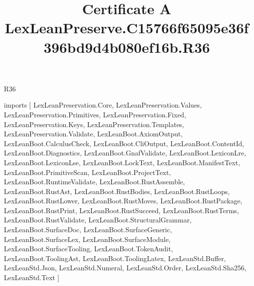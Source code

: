 \begin{lexlean}{R36}
\title{Certificate A LexLeanPreserve.C15766f65095e36f396bd9d4b080ef16b.R36}
\begin{coremodule}
imports [
  LexLeanPreservation.Core,
  LexLeanPreservation.Values,
  LexLeanPreservation.Primitives,
  LexLeanPreservation.Fixed,
  LexLeanPreservation.Keys,
  LexLeanPreservation.Templates,
  LexLeanPreservation.Validate,
  LexLeanBoot.AxiomOutput,
  LexLeanBoot.CalculusCheck,
  LexLeanBoot.CliOutput,
  LexLeanBoot.ContentId,
  LexLeanBoot.Diagnostics,
  LexLeanBoot.GnafValidate,
  LexLeanBoot.LexiconLre,
  LexLeanBoot.LexiconLse,
  LexLeanBoot.LockText,
  LexLeanBoot.ManifestText,
  LexLeanBoot.PrimitiveScan,
  LexLeanBoot.ProjectText,
  LexLeanBoot.RuntimeValidate,
  LexLeanBoot.RustAssemble,
  LexLeanBoot.RustAst,
  LexLeanBoot.RustBodies,
  LexLeanBoot.RustLoops,
  LexLeanBoot.RustLower,
  LexLeanBoot.RustMoves,
  LexLeanBoot.RustPackage,
  LexLeanBoot.RustPrint,
  LexLeanBoot.RustSucceed,
  LexLeanBoot.RustTerms,
  LexLeanBoot.RustValidate,
  LexLeanBoot.StructuralGrammar,
  LexLeanBoot.SurfaceDoc,
  LexLeanBoot.SurfaceGeneric,
  LexLeanBoot.SurfaceLex,
  LexLeanBoot.SurfaceModule,
  LexLeanBoot.SurfaceTooling,
  LexLeanBoot.TokenAudit,
  LexLeanBoot.ToolingAst,
  LexLeanBoot.ToolingLatex,
  LexLeanStd.Buffer,
  LexLeanStd.Json,
  LexLeanStd.Numeral,
  LexLeanStd.Order,
  LexLeanStd.Sha256,
  LexLeanStd.Text
]


\end{coremodule}
\end{lexlean}

